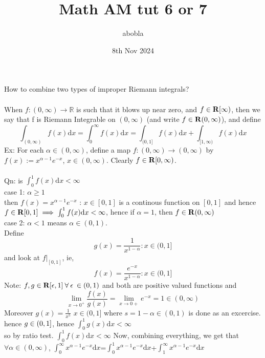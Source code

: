 \documentclass{article}
\title{Math AM tut 6 or 7}
\date{8th Nov 2024}
\author{abobla}
\begin{document}
\maketitle
\section{}
How to combine two types of improper Riemann integrals?\\
\\
When $f:(0,\infty)\rightarrow \mathbb R$ is such that it blows up near zero, and $f\in \bold{R}[\infty)$, then we say that f is Riemann Integrable on $(0,\infty)$
(and write $f \in \bold R(0,\infty)$), and define\\
\begin{equation}
    \int_{(0,\infty)} f(x) \mathrm d x = \int_{0}^{\infty}f(x) \mathrm d x = \int_{(0,1]}f(x) \mathrm d x + \int_{[1,\infty)}f(x) \mathrm d x
\end{equation}
Ex: For each $\alpha \in (0,\infty)$, define a map $f:(0,\infty)\rightarrow(0,\infty)$ by $f(x):= x^{\alpha-1}e^{-x}$, $x\in(0,\infty)$. Clearly $f\in \bold{R}[0,\infty)$.
\\
\\
Qn: is $\int_{0}^{1} f(x) \mathrm{d} x < \infty$\\
case 1: $\alpha \geq 1$\\
then $f(x) = x^{\alpha-1}e^{-x}$ : $x \in [0,1]$ is a continous function on $[0,1]$ and hence $f \in \bold R[0,1]\implies\int_{0}^{1}f(x) \mathrm d x < \infty$, hence if $\alpha=1$, then $f\in \bold R(0,\infty)$\\
case 2: $\alpha < 1$ means $\alpha \in (0,1)$.\\
Define
\begin{equation}
    g(x) = \frac{1}{x^{1-\alpha}}:x \in (0,1]
\end{equation}
and look at $f|_{[0,1]}$, ie,
\begin{equation}
    f(x) = \frac{e^{-x}}{x^{1-\alpha}}: x \in (0,1]
\end{equation}
Note: $f,g\in \bold R[\epsilon,1]\:\forall\:\epsilon\:\in (0,1)$ and both are positive valued functions and
\begin{equation}
    \underset{x\rightarrow0^{+}}{\lim} \frac{f(x)}{g(x)} = \underset{x \rightarrow 0{+}}{\lim} e^{-x} = 1 \in (0,\infty)
\end{equation}
Moreover $g(x) = \frac{1}{x^5}$  $x\in(0,1]$ where $s = 1-\alpha \in (0,1)$ is done as an excercise. hence $g \in \bold (0,1]$, hence $\int_{0}^{1}g(x) \mathrm d x < \infty$\\
so by ratio test. $\int_{0}^{1}f(x)\mathrm d x < \infty$ Now, combining everything, we get that $\forall \alpha \in (0,\infty)$, $\int_{0}^{\infty}x^{\alpha-1}e^{-x}\mathrm d x$=$\int_{0}^{1}x^{\alpha-1}e^{-x}\mathrm d x$+$\int_{1}^{\infty}x^{\alpha-1}e^{-x} \mathrm d x$
\end{document}
